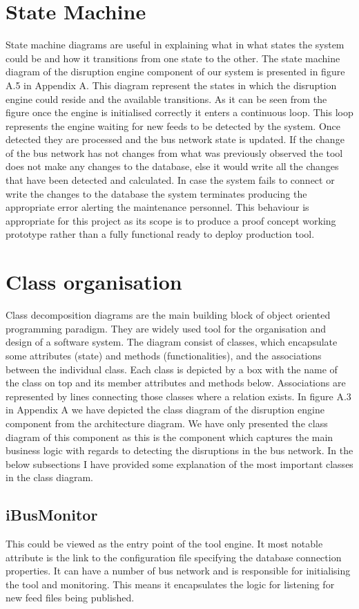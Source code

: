 \section{State Machine}
State machine diagrams are useful in explaining what in what states the system could be and how it transitions from one state to the other. The state machine diagram of the disruption engine component of our system is presented in figure A.5 in Appendix A. This diagram represent the states in which the disruption engine could reside and the available transitions. As it can be seen from the figure once the engine is initialised correctly it enters a continuous loop. This loop represents the engine waiting for new feeds to be detected by the system. Once detected they are processed and the bus network state is updated. If the change of the bus network has not changes from what was previously observed the tool does not make any changes to the database, else it would write all the changes that have been detected and calculated. In case the system fails to connect or write the changes to the database the system terminates producing the appropriate error alerting the maintenance personnel. This behaviour is appropriate for this project as its scope is to produce a proof concept working prototype rather than a fully functional ready to deploy production tool.

\section{Class organisation}
Class decomposition diagrams are the main building block of object oriented programming paradigm. They are widely used tool for the organisation and design of a software system. The diagram consist of classes, which encapsulate some attributes (state) and methods (functionalities), and the associations between the individual class. Each class is depicted by a box with the name of the class on top and its member attributes and methods below. Associations are represented by lines connecting those classes where a relation exists. In figure A.3 in Appendix A we have depicted the class diagram of the disruption engine component from the architecture diagram. We have only presented the class diagram of this component as this is the component which captures the main business logic with regards to detecting the disruptions in the bus network. In the below subsections I have provided some explanation of the most important classes in the class diagram.

\subsection{iBusMonitor}
This could be viewed as the entry point of the tool engine. It most notable attribute is the link to the configuration file specifying the database connection properties. It can have a number of bus network and is responsible for initialising the tool and monitoring. This means it encapsulates the logic for listening for new feed files being published.

